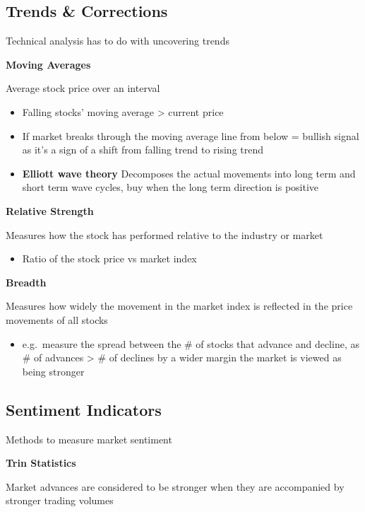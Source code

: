 \documentclass[]{book}
\providecommand{\tightlist}{%
  \setlength{\itemsep}{0pt}\setlength{\parskip}{0pt}}
\theoremstyle{definition}
\theoremstyle{definition}
\theoremstyle{remark}
\begin{document}
\subsection{Trends \& Corrections}\label{trends-corrections}

Technical analysis has to do with uncovering trends

\textbf{Moving Averages}

Average stock price over an interval

\begin{itemize}
\item
  Falling stocks' moving average \textgreater{} current price
\item
  If market breaks through the moving average line from below = bullish
  signal as it's a sign of a shift from falling trend to rising trend
\item
  \textbf{Elliott wave theory} Decomposes the actual movements into long
  term and short term wave cycles, buy when the long term direction is
  positive
\end{itemize}

\textbf{Relative Strength}

Measures how the stock has performed relative to the industry or market

\begin{itemize}
\tightlist
\item
  Ratio of the stock price vs market index
\end{itemize}

\textbf{Breadth}

Measures how widely the movement in the market index is reflected in the
price movements of all stocks

\begin{itemize}
\tightlist
\item
  e.g.~measure the spread between the \# of stocks that advance and
  decline, as \# of advances \textgreater{} \# of declines by a wider
  margin the market is viewed as being stronger
\end{itemize}

\subsection{Sentiment Indicators}\label{sentiment-indicators}

Methods to measure market sentiment

\textbf{Trin Statistics}

Market advances are considered to be stronger when they are accompanied
by stronger trading volumes
\end{document}
